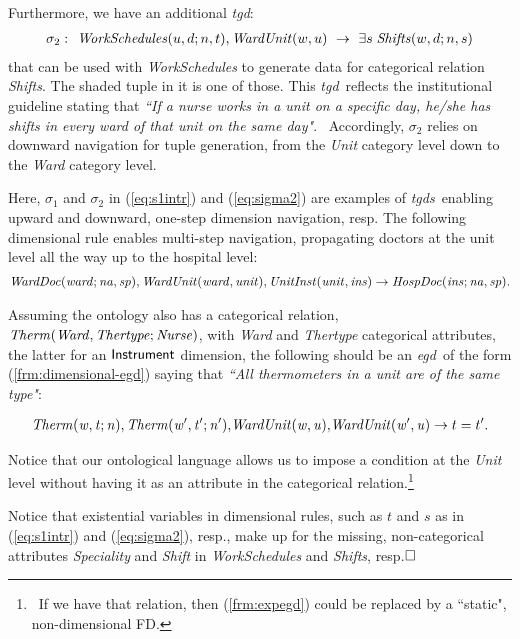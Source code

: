 \documentclass[format=acmsmall, review=false, screen=true]{acmart}
\newcommand{\boxtheorem}{\ensuremath{\hfill \Box}}
\newcommand{\nit}[1]{{\it #1}}
\newcommand{\fd}{FD}
\newcommand{\egd}{{\em egd}}
\newcommand{\tgds}{{\em tgds}}
\newcommand{\tgd}{{\em tgd}}
\newcommand{\blue}[1]{{#1}}
\begin{document}
\begin{example}
Furthermore, we have an additional \tgd:
\begin{align}
\sigma_2&:&\!\!\nit{WorkSchedules}(u,d;n,t),\nit{WardUnit}(w,u)  ~\rightarrow~ \exists s\;\nit{Shifts}(w,d;n,s) \label{eq:sigma2}
\end{align}
that can be used with  \nit{WorkSchedules}  to generate data for categorical relation \nit{Shifts}. The shaded tuple in it is one of those.
 This \tgd \ reflects the institutional guideline stating that {\em ``If a nurse works in a unit on a specific day, he/she has shifts in every ward of that unit on the same day"}. \ Accordingly, $\sigma_2$ relies on downward navigation for tuple generation, from the {\it Unit} category level down to the {\it Ward} category level.

\blue{Here, $\sigma_1$ and $\sigma_2$ in (\ref{eq:s1intr}) and (\ref{eq:sigma2}) are examples of \tgds \ enabling upward and downward, one-step dimension navigation, resp.  The following dimensional rule enables multi-step navigation,  propagating doctors at the unit level all the way up to the hospital level: \
\begin{align}\nit{WardDoc}(\nit{ward};\nit{na},\nit{sp}),\nit{WardUnit}(\nit{ward,unit}),\nit{UnitInst}(\nit{unit,ins})  \rightarrow \nit{HospDoc}(\nit{ins};\nit{na},\nit{sp}). \label{eq:multi}
\end{align}}

\vspace{-4mm}
Assuming the ontology also has  a categorical relation, ${\it Therm(Ward,Thertype};\nit{Nurse})$, with \nit{Ward} and \nit{Thertype} categorical attributes, the latter for an ${\sf Instrument}$  dimension,
the following should be an \egd \ of the form (\ref{frm:dimensional-egd}) saying that {\em ``All thermometers in a unit are of the same type"}:

\vspace{-4mm}
\begin{align} \label{frm:expegd}
{\it Therm(w,t;n)},{\it Therm(w',t';n')},\!{\it WardUnit(w,u)},\!{\it WardUnit(w',u)} \rightarrow t=t'.
\end{align}
\vspace{-4mm}

\noindent Notice that our ontological language allows us to impose a condition at the {\it Unit} level without having it as an attribute in the categorical relation.\footnote{\ If we have that relation, then (\ref{frm:expegd}) could be replaced by a ``static", non-dimensional \fd.}

Notice that existential variables in dimensional rules, such as  $t$ and $s$ as in (\ref{eq:s1intr}) and (\ref{eq:sigma2}), resp., make up for the missing, non-categorical attributes {\it Speciality} and {\it Shift} in {\it WorkSchedules} and {\it Shifts}, resp.\boxtheorem \end{example}
\end{document}
